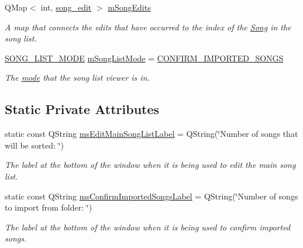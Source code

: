 \begin{DoxyCompactItemize}
Q\+Map$<$ int, \mbox{\hyperlink{struct_song_list_viewer_window_1_1song__edit}{song\+\_\+edit}} $>$ \mbox{\hyperlink{class_song_list_viewer_window_aa38d8a91dc7ebe0925602b3846c34fdc}{m\+Song\+Edits}}
\begin{DoxyCompactList}\small\item\em A map that connects the edits that have occurred to the index of the \mbox{\hyperlink{class_song}{Song}} in the song list. \end{DoxyCompactList}\item 
\mbox{\hyperlink{class_song_list_viewer_window_a6f23a68c416173f6b571a2cc4990a927}{S\+O\+N\+G\+\_\+\+L\+I\+S\+T\+\_\+\+M\+O\+DE}} \mbox{\hyperlink{class_song_list_viewer_window_a1c242af144718150837feff19386dc73}{m\+Song\+List\+Mode}} = \mbox{\hyperlink{class_song_list_viewer_window_a6f23a68c416173f6b571a2cc4990a927a9847037eeae7688b9cddf8700d425332}{C\+O\+N\+F\+I\+R\+M\+\_\+\+I\+M\+P\+O\+R\+T\+E\+D\+\_\+\+S\+O\+N\+GS}}
\begin{DoxyCompactList}\small\item\em The \mbox{\hyperlink{class_song_list_viewer_window_a6f23a68c416173f6b571a2cc4990a927}{mode}} that the song list viewer is in. \end{DoxyCompactList}\end{DoxyCompactItemize}
\subsection*{Static Private Attributes}
\begin{DoxyCompactItemize}
\item 
static const Q\+String \mbox{\hyperlink{class_song_list_viewer_window_aced76ec4265d0194f9b793133e661406}{ms\+Edit\+Main\+Song\+List\+Label}} = Q\+String(\char`\"{}Number of songs that will be sorted\+: \char`\"{})
\begin{DoxyCompactList}\small\item\em The label at the bottom of the window when it is being used to edit the main song list. \end{DoxyCompactList}\item 
static const Q\+String \mbox{\hyperlink{class_song_list_viewer_window_afd987f0161763fac7d03b0ccff54ef39}{ms\+Confirm\+Imported\+Songs\+Label}} = Q\+String(\char`\"{}Number of songs to import from folder\+: \char`\"{})
\begin{DoxyCompactList}\small\item\em The label at the bottom of the window when it is being used to confirm imported songs. \end{DoxyCompactList}\end{DoxyCompactItemize}


